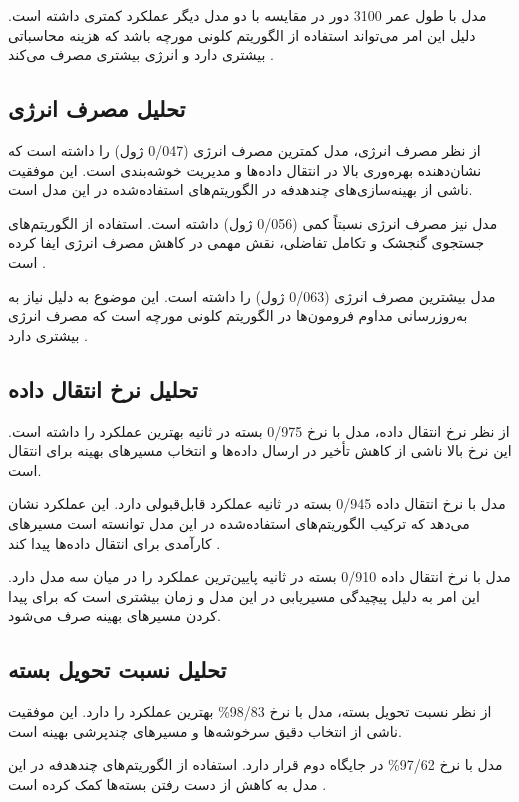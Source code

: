 \documentclass[12pt, onecolumn, a4paper]{article}
\begin{document}
مدل  با طول عمر 3100 دور در مقایسه با دو مدل دیگر عملکرد کمتری داشته است. دلیل این امر می‌تواند استفاده از الگوریتم کلونی مورچه باشد که هزینه محاسباتی بیشتری دارد و انرژی بیشتری مصرف می‌کند \cite{ref10}.

\subsection*{تحلیل مصرف انرژی}
از نظر مصرف انرژی، مدل  کمترین مصرف انرژی (0/047 ژول) را داشته است که نشان‌دهنده بهره‌وری بالا در انتقال داده‌ها و مدیریت خوشه‌بندی است. این موفقیت ناشی از بهینه‌سازی‌های چندهدفه در الگوریتم‌های استفاده‌شده در این مدل است.

مدل  نیز مصرف انرژی نسبتاً کمی (0/056 ژول) داشته است. استفاده از الگوریتم‌های جستجوی گنجشک و تکامل تفاضلی، نقش مهمی در کاهش مصرف انرژی ایفا کرده است \cite{ref8}.

مدل  بیشترین مصرف انرژی (0/063 ژول) را داشته است. این موضوع به دلیل نیاز به به‌روزرسانی مداوم فرومون‌ها در الگوریتم کلونی مورچه است که مصرف انرژی بیشتری دارد \cite{ref9}.

\subsection*{تحلیل نرخ انتقال داده}
از نظر نرخ انتقال داده، مدل  با نرخ 0/975 بسته در ثانیه بهترین عملکرد را داشته است. این نرخ بالا ناشی از کاهش تأخیر در ارسال داده‌ها و انتخاب مسیرهای بهینه برای انتقال است.

مدل  با نرخ انتقال داده 0/945 بسته در ثانیه عملکرد قابل‌قبولی دارد. این عملکرد نشان می‌دهد که ترکیب الگوریتم‌های استفاده‌شده در این مدل توانسته است مسیرهای کارآمدی برای انتقال داده‌ها پیدا کند \cite{ref8}.

مدل  با نرخ انتقال داده 0/910 بسته در ثانیه پایین‌ترین عملکرد را در میان سه مدل دارد. این امر به دلیل پیچیدگی مسیریابی در این مدل و زمان بیشتری است که برای پیدا کردن مسیرهای بهینه صرف می‌شود.

\subsection*{تحلیل نسبت تحویل بسته}
از نظر نسبت تحویل بسته، مدل  با نرخ 98/83\% بهترین عملکرد را دارد. این موفقیت ناشی از انتخاب دقیق سرخوشه‌ها و مسیرهای چندپرشی بهینه است.

مدل  با نرخ 97/62\% در جایگاه دوم قرار دارد. استفاده از الگوریتم‌های چندهدفه در این مدل به کاهش از دست رفتن بسته‌ها کمک کرده است \cite{ref9}.
\end{document}
